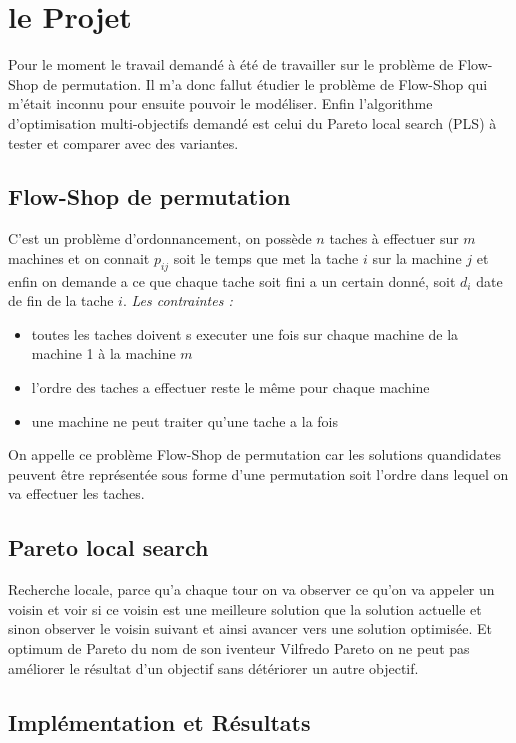 \documentclass[a4paper,10pt]{report}
\begin{document}
\chapter{le Projet}
  Pour le moment le travail demandé à été de travailler sur le problème de Flow-Shop de permutation. Il m'a donc fallut 
  étudier le problème de Flow-Shop qui m'était inconnu pour ensuite pouvoir le modéliser. Enfin l'algorithme d'optimisation
  multi-objectifs demandé est celui du Pareto local search (PLS) à tester et comparer avec des variantes.
  \section{Flow-Shop de permutation}
    C'est un problème d'ordonnancement, on possède $n$ taches à effectuer sur $m$ machines et on connait $p_{ij}$ soit le temps
    que met la tache $i$ sur la machine $j$ et enfin on demande a ce que chaque tache soit fini a un certain donné, 
    soit $d_i$ date de fin de la tache $i$.\newline
    \emph{Les contraintes :}
    \begin{itemize}
     \item toutes les taches doivent s executer une fois sur chaque machine de la machine 1 à la machine $m$
     \item l'ordre des taches a effectuer reste le même pour chaque machine
     \item une machine ne peut traiter qu'une tache a la fois
    \end{itemize}
    On appelle ce problème Flow-Shop de permutation car les solutions quandidates peuvent être représentée sous forme 
    d'une permutation soit l'ordre dans lequel on va effectuer les taches.
    
    
  \section{Pareto local search}
    Recherche locale, parce qu'a chaque tour on va observer ce qu'on va appeler un voisin et voir si ce voisin 
    est une meilleure solution que la solution actuelle et sinon observer le voisin suivant et ainsi avancer 
    vers une solution optimisée. Et optimum de Pareto du nom de son iventeur Vilfredo Pareto on ne peut pas améliorer le 
    résultat d'un objectif sans détériorer un autre objectif.
  
  \section{Implémentation et Résultats}
    
\end{document}
